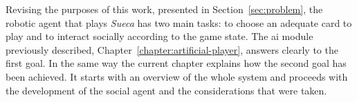 \label{chapter:sueca-player}

Revising the purposes of this work, presented in Section~\ref{sec:problem}, the robotic agent that plays \emph{Sueca} has two main tasks: to choose an adequate card to play and to interact socially according to the game state.
The \ac{ai} module previously described, Chapter~\ref{chapter:artificial-player}, answers clearly to the first goal.
In the same way the current chapter explains how the second goal has been achieved.
It starts with an overview of the whole system and proceeds
with the development of the social agent and the considerations that were taken.




\clearpage

